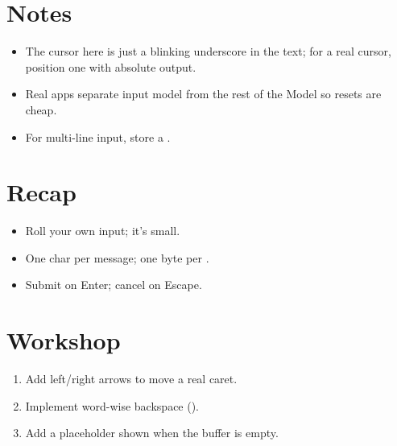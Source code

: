 \section{Notes}

\begin{itemize}[leftmargin=*]
  \item The cursor here is just a blinking underscore in the
    text; for a real cursor, position one with absolute
    output.
  \item Real apps separate input model from the rest of the
    Model so resets are cheap.
  \item For multi-line input, store a .
\end{itemize}

\section{Recap}

\begin{recap}
\begin{itemize}[leftmargin=*]
  \item Roll your own input; it's small.
  \item One char per  message; one byte per
    .
  \item Submit on Enter; cancel on Escape.
\end{itemize}
\end{recap}

\section*{Workshop}

\begin{enumerate}[leftmargin=*]
  \item Add left/right arrows to move a real caret.
  \item Implement word-wise backspace ().
  \item Add a placeholder shown when the buffer is empty.
\end{enumerate}
